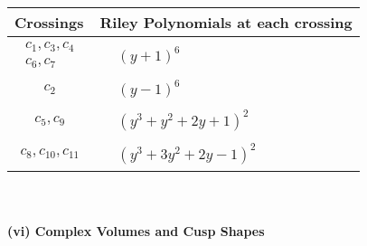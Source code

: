 \documentclass[1p]{elsarticle_modified}
\theoremstyle{definition}
\begin{document}
\begin{tabular}{m{50pt}|m{274pt}}
Crossings & \hspace{64pt}Riley Polynomials at each crossing \\
\hline $$\begin{aligned}c_{1},c_{3},c_{4}\\c_{6},c_{7}\end{aligned}$$&$\begin{aligned}
&(y+1)^6
\end{aligned}$\\
\hline $$\begin{aligned}c_{2}\end{aligned}$$&$\begin{aligned}
&(y-1)^6
\end{aligned}$\\
\hline $$\begin{aligned}c_{5},c_{9}\end{aligned}$$&$\begin{aligned}
&(y^3+y^2+2 y+1)^2
\end{aligned}$\\
\hline $$\begin{aligned}c_{8},c_{10},c_{11}\end{aligned}$$&$\begin{aligned}
&(y^3+3 y^2+2 y-1)^2
\end{aligned}$\\
\hline
\end{tabular}\\~\\
\newpage\flushleft \textbf{(vi) Complex Volumes and Cusp Shapes}
\end{document}
